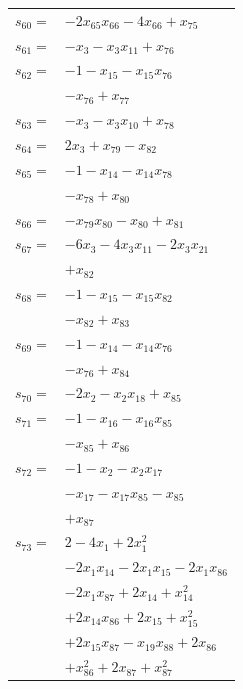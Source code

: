 \begin{longtable}{@{}r@{\;}l@{}}
\(s_{60}=\) & \(\displaystyle -2x_{65}x_{66} -4x_{66} +x_{75}\) \\[3pt]
\(s_{61}=\) & \(\displaystyle -x_{3} -x_{3}x_{11} +x_{76}\) \\[3pt]
\(s_{62}=\) & \(\displaystyle -1 -x_{15} -x_{15}x_{76}\) \\
 & \(\displaystyle -x_{76} +x_{77}\) \\[3pt]
\(s_{63}=\) & \(\displaystyle -x_{3} -x_{3}x_{10} +x_{78}\) \\[3pt]
\(s_{64}=\) & \(\displaystyle 2x_{3} +x_{79} -x_{82}\) \\[3pt]
\(s_{65}=\) & \(\displaystyle -1 -x_{14} -x_{14}x_{78}\) \\
 & \(\displaystyle -x_{78} +x_{80}\) \\[3pt]
\(s_{66}=\) & \(\displaystyle -x_{79}x_{80} -x_{80} +x_{81}\) \\[3pt]
\(s_{67}=\) & \(\displaystyle -6x_{3} -4x_{3}x_{11} -2x_{3}x_{21}\) \\
 & \(\displaystyle +x_{82}\) \\[3pt]
\(s_{68}=\) & \(\displaystyle -1 -x_{15} -x_{15}x_{82}\) \\
 & \(\displaystyle -x_{82} +x_{83}\) \\[3pt]
\(s_{69}=\) & \(\displaystyle -1 -x_{14} -x_{14}x_{76}\) \\
 & \(\displaystyle -x_{76} +x_{84}\) \\[3pt]
\(s_{70}=\) & \(\displaystyle -2x_{2} -x_{2}x_{18} +x_{85}\) \\[3pt]
\(s_{71}=\) & \(\displaystyle -1 -x_{16} -x_{16}x_{85}\) \\
 & \(\displaystyle -x_{85} +x_{86}\) \\[3pt]
\(s_{72}=\) & \(\displaystyle -1 -x_{2} -x_{2}x_{17}\) \\
 & \(\displaystyle -x_{17} -x_{17}x_{85} -x_{85}\) \\
 & \(\displaystyle +x_{87}\) \\[3pt]
\(s_{73}=\) & \(\displaystyle 2 -4x_{1} +2x_{1}^{2}\) \\
 & \(\displaystyle -2x_{1}x_{14} -2x_{1}x_{15} -2x_{1}x_{86}\) \\
 & \(\displaystyle -2x_{1}x_{87} +2x_{14} +x_{14}^{2}\) \\
 & \(\displaystyle +2x_{14}x_{86} +2x_{15} +x_{15}^{2}\) \\
 & \(\displaystyle +2x_{15}x_{87} -x_{19}x_{88} +2x_{86}\) \\
 & \(\displaystyle +x_{86}^{2} +2x_{87} +x_{87}^{2}\) \\

\end{longtable}
